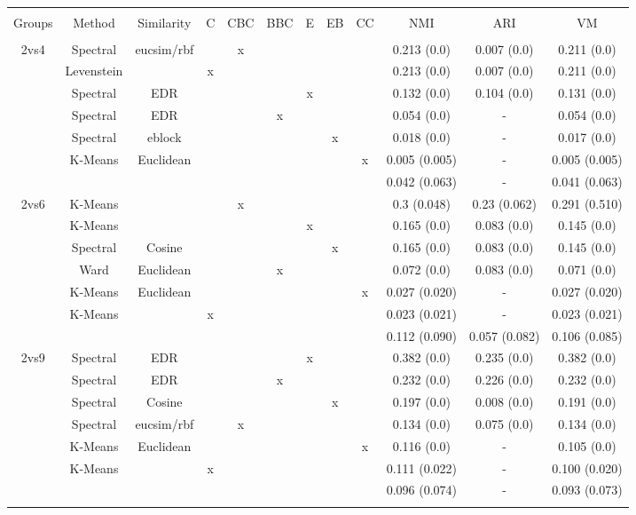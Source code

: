 \documentclass[12pt,a4paper,bibliography=totocnumbered,listof=totocnumbered]{scrartcl}
\begin{document}
{\begin{appendix}
\begin{table}[!htbp] \centering 
	\caption{} 
	\label{} 
	\scriptsize 
	\begin{tabular}{@{\extracolsep{0pt}} cccccccccccc} 
		\\[-1.8ex]\hline 
		\hline \\[-1.8ex] 
		Groups & Method & Similarity & C & CBC & BBC & E & EB & CC & NMI & ARI & VM \\ 
		\hline \\[-1.8ex] 
		2vs4 & Spectral & eucsim/rbf &  & x &  &  &  &  & 0.213 (0.0) & 0.007 (0.0) & 0.211 (0.0) \\ 
		& Levenstein &  & x &  &  &  &  &  & 0.213 (0.0) & 0.007 (0.0) & 0.211 (0.0) \\ 
		& Spectral & EDR &  &  &  & x &  &  & 0.132 (0.0) & 0.104 (0.0) & 0.131 (0.0) \\ 
		& Spectral & EDR &  &  & x &  &  &  & 0.054 (0.0) & - & 0.054 (0.0) \\ 
		& Spectral & eblock &  &  &  &  & x &  & 0.018 (0.0) & - & 0.017 (0.0) \\ 
		& K-Means & Euclidean &  &  &  &  &  & x & 0.005 (0.005) & - & 0.005 (0.005) \\ 
		&  &  &  &  &  &  &  &  & 0.042 (0.063) & - & 0.041 (0.063) \\ 
		2vs6 & K-Means &  &  & x &  &  &  &  & 0.3 (0.048) & 0.23 (0.062) & 0.291 (0.510) \\ 
		& K-Means &  &  &  &  & x &  &  & 0.165 (0.0) & 0.083 (0.0) & 0.145 (0.0) \\ 
		& Spectral & Cosine &  &  &  &  & x &  & 0.165 (0.0) & 0.083 (0.0) & 0.145 (0.0) \\ 
		& Ward & Euclidean &  &  & x &  &  &  & 0.072 (0.0) & 0.083 (0.0) & 0.071 (0.0) \\ 
		& K-Means & Euclidean &  &  &  &  &  & x & 0.027 (0.020) & - & 0.027 (0.020) \\ 
		& K-Means &  & x &  &  &  &  &  & 0.023 (0.021) & - & 0.023 (0.021) \\ 
		&  &  &  &  &  &  &  &  & 0.112 (0.090) & 0.057 (0.082) & 0.106 (0.085) \\ 
		2vs9 & Spectral & EDR &  &  &  & x &  &  & 0.382 (0.0) & 0.235 (0.0) & 0.382 (0.0) \\ 
		& Spectral & EDR &  &  & x &  &  &  & 0.232 (0.0) & 0.226 (0.0) & 0.232 (0.0) \\ 
		& Spectral & Cosine &  &  &  &  & x &  & 0.197 (0.0) & 0.008 (0.0) & 0.191 (0.0) \\ 
		& Spectral & eucsim/rbf &  & x &  &  &  &  & 0.134 (0.0) & 0.075 (0.0) & 0.134 (0.0) \\ 
		& K-Means & Euclidean &  &  &  &  &  & x & 0.116 (0.0) & - & 0.105 (0.0) \\ 
		& K-Means &  & x &  &  &  &  &  & 0.111 (0.022) & - & 0.100 (0.020) \\ 
		&  &  &  &  &  &  &  &  & 0.096 (0.074) & - & 0.093 (0.073) \\ 
		\hline \\[-1.8ex] 
	\end{tabular} 
\end{table} 






\end{appendix}}
\end{document}
